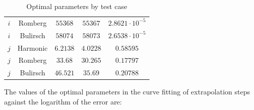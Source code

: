 \begin{table}[H]
\begin{tabular}{c|c||c|c|c}
$i$ & Romberg & \(55368\) & \(55367\) & \(2.8621\cdot 10^{-5}\) \\
$i$ & Bulirsch & \(58074\) & \(58073\) & \(2.6538\cdot 10^{-5}\) \\
$j$ & Harmonic & \(6.2138\) & \(4.0228\) & \(0.58595\) \\
$j$ & Romberg & \(33.68\) & \(30.265\) & \(0.17797\) \\
$j$ & Bulirsch & \(46.521\) & \(35.69\) & \(0.20788\) \\
    \end{tabular}
    \caption{Optimal parameters by test case}
    \label{tab:my_label}
\end{table}

The values of the optimal parameters in the curve fitting of extrapolation steps against the logarithm of the error are:

